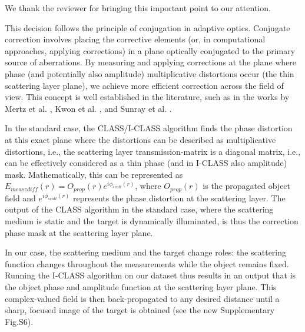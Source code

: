 \documentclass[12pt]{article}
\newcommand{\hlred}[1]{\sethlcolor{red!30}\hl{#1}}
\newenvironment{ourresponse}
    {\begin{tcolorbox}[width=\linewidth,breakable,enhanced,colback=gray!5,colframe=responsecolor!50,title=Response,left=5pt,right=5pt]}
    {\end{tcolorbox}}
\begin{document}
\begin{enumerate}[label=\arabic*.]
\begin{ourresponse}

        We thank the reviewer for bringing this important point to our attention.
        
        This decision follows the principle of conjugation in adaptive optics. Conjugate correction involves placing the corrective elements (or, in computational approaches, applying corrections) in a plane optically conjugated to the primary source of aberrations. By measuring and applying corrections at the plane where phase (and potentially also amplitude) multiplicative distortions occur (the thin scattering layer plane), we achieve more efficient correction across the field of view. This concept is well established in the literature, such as in the works by Mertz et al. \cite{mertz2015field}, Kwon et al. \cite{kwon2023computational}, and Sunray et al. \cite{sunray2024beyond}.
        
        In the standard case, the CLASS/I-CLASS algorithm finds the phase distortion at this exact plane where the distortions can be described as multiplicative distortions, i.e., the scattering layer transmission-matrix is a diagonal matrix, i.e., can be effectively considered as a thin phase (and in I-CLASS also amplitude) mask. Mathematically, this can be represented as $E_{meas zdiff}(r)=O_{prop}(r)e^{i\phi_{scatt}(r)}$, where $O_{prop}(r)$ is the propagated object field and $e^{i\phi_{scatt}(r)}$ represents the phase distortion at the scattering layer. The output of the CLASS algorithm in the standard case, where the scattering medium is static and the target is dynamically illuminated, is thus the correction phase mask at the scattering layer plane. 

        In our case, the scattering medium and the target change roles: the scattering function changes throughout the measurements while the object remains fixed. Running the I-CLASS algorithm on our dataset thus results in an output that is the object phase and amplitude function at the scattering layer plane. This complex-valued field is then back-propagated to any desired distance until a sharp, focused image of the target is obtained (see the new Supplementary Fig.S6).

\end{ourresponse}
\end{enumerate}
\end{document}
